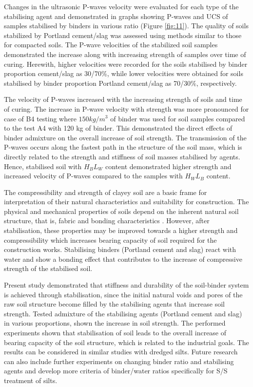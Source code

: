 \documentclass{amestyle}
\begin{document}
Changes in the ultrasonic P-waves velocity were evaluated for each type of the stabilising agent and demonstrated in graphs showing P-waves and UCS of samples stabilised by binders in various ratio (Figure \ref{fig:11}). The quality of soils stabilized by Portland cement/slag was assessed using methods similar to those for compacted soils. The P-wave velocities of the stabilized soil samples demonstrated the increase along with increasing strength of samples over time of curing. Herewith, higher velocities were recorded for the soils stabilised by binder proportion cement/slag as 30/70\%, while lower velocities were obtained for soils stabilised by binder proportion Portland cement/slag as 70/30\%, respectively. 

The velocity of P-waves increased with the increasing strength of soils and time of curing. The increase in P-wave velocity with strength was more pronounced for case of B4 testing where $150 kg/m^3$ of binder was used for soil samples compared to the test A4 with 120 kg of binder. This demonstrated the direct effects of binder admixture on the overall increase of soil strength. The transmission of the P-waves occurs along the fastest path in the structure of the soil mass, which is directly related to the strength and stiffness of soil masses stabilised by agents. Hence, stabilised soil with $H_BL_W$ content demonstrated higher strength and increased velocity of P-waves compared to the samples with $H_WL_B$  content.

The compressibility and strength of clayey soil are a basic frame for interpretation of their natural characteristics and suitability for construction. The physical and mechanical properties of soils depend on the inherent natural soil structure, that is, fabric and bonding characteristics \cite{Burland}. However, after stabilisation, these properties may be improved towards a higher strength and compressibility which increases bearing capacity of soil required for the construction works. Stabilising binders (Portland cement and slag) react with water and show a bonding effect that contributes to the increase of compressive strength of the stabilised soil. 

Present study demonstrated that stiffness and durability of the soil-binder system is achieved through stabilisation, since the initial natural voids and pores of the raw soil structure become filled by the stabilising agents that increase soil strength. Tested admixture of the stabilising agents (Portland cement and slag) in various proportions, shown the increase in soil strength. The performed experiments shown that stabilisation of soil leads to the overall increase of bearing capacity of the soil structure, which is related to the industrial goals. The results can be considered in similar studies with dredged silts. Future research can also include further experiments on changing binder ratio and stabilising agents and develop more criteria of binder/water ratios specifically for S/S treatment of silts.
\end{document}
